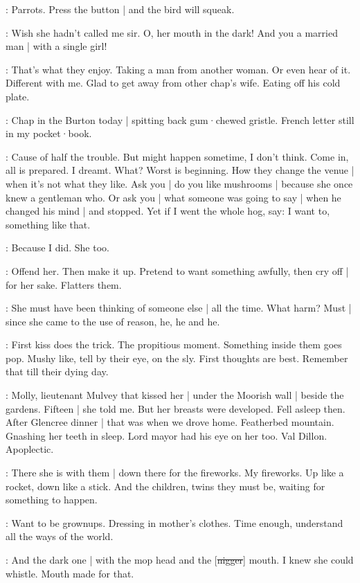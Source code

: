 \BloomAbstract:
Parrots.
Press the button |
and the bird will squeak.

\BloomHist:
Wish she hadn't called me sir.
O,
her mouth in the dark!
And you a married man |
with a single girl!

\BloomAbstract:
That's what they enjoy.
Taking a man from another woman.
Or even hear of it.
Different with me.
Glad to get away from other chap's wife.
Eating off his cold plate.

\BloomToday:
Chap in the Burton today |
spitting back gum·chewed gristle.
French letter still in my pocket·book.

\BloomAbstract:
Cause of half the trouble.
But might happen sometime,
I don't think.
Come in,
all is prepared.
I dreamt.
What?
Worst is beginning.
How they change the venue |
when it's not what they like.%
Ask you |
do you like mushrooms |
because she once knew a gentleman who.
Or ask you |
what someone was going to say |
when he changed his mind |
and stopped.
Yet if I went the whole hog,
say:
I want to,
something like that.

\BloomCurrent:
Because I did.
She too.

\BloomAbstract:
Offend her.
Then make it up.
Pretend to want something awfully,
then cry off |
for her sake.
Flatters them.

\BloomCurrent:
She must have been thinking of someone else |
all the time.
What harm?
Must |
since she came to the use of reason,
he,
he and he.

\BloomAbstract:
First kiss does the trick.
The propitious moment.
Something inside them goes pop.
Mushy like,
tell by their eye,
on the sly.
First thoughts are best.
Remember that
till their dying day.

\BloomHist:
Molly,
lieutenant Mulvey that kissed her |
under the Moorish wall |
beside the gardens.%
Fifteen |
she told me.
But her breasts were developed.
Fell asleep then.
After Glencree dinner |
that was when we drove home.
Featherbed mountain.
Gnashing her teeth in sleep.
Lord mayor had his eye on her too.
Val Dillon.
Apoplectic.

\BloomCurrent:
There she is with them |
down there for the fireworks.
My fireworks.
Up like a rocket,
down like a stick.
And the children,
twins they must be,
waiting for something to happen.

\BloomAbstract:
Want to be grownups.
Dressing in mother's clothes.
Time enough,
understand all the ways of the world.

\BloomCurrent:
And the dark one |
with the mop head
and the [\sout{nigger}] mouth.
I knew she could whistle.
Mouth made for that.

